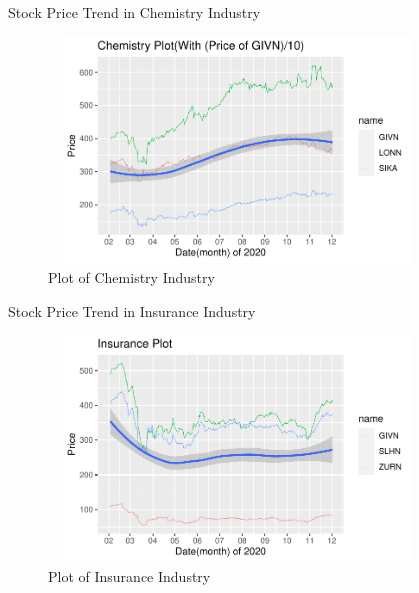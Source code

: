 \documentclass{beamer}
\begin{document}
\begin{frame}{Stock Price Trend in Chemistry Industry}
    \begin{figure}
        \centering
        \includegraphics[width = 10cm, height = 6cm]{Chemistry.pdf}
        \caption{Plot of Chemistry Industry}
        \label{fig:mylabel5}
    \end{figure}
\end{frame}    

\begin{frame}{Stock Price Trend in Insurance Industry}
    \begin{figure}
        \centering
        \includegraphics[width = 10cm, height = 6cm]{Insurance.pdf}
        \caption{Plot of Insurance Industry}
        \label{fig:mylabel6}
    \end{figure}
\end{frame}
\end{document}

